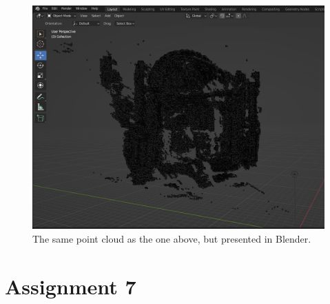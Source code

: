 \documentclass[a4paper, titlepage,12pt]{article}
\begin{document}
\begin{figure}[H]
	\begin{center}
		\includegraphics*[scale=0.4]{./sfm_blender.png}
		\caption{The same point cloud as the one above, but presented in Blender.}
	\end{center}
\end{figure}

\section*{Assignment 7}
\end{document}
